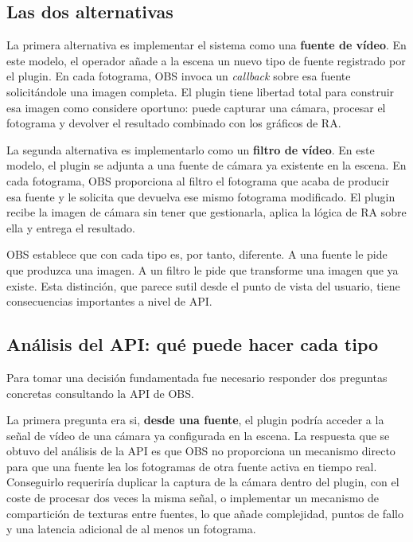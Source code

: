 \subsection{Las dos alternativas }
\label{subsec:alternativas_obs}

La primera alternativa es implementar el sistema como una \textbf{fuente de vídeo}. En este modelo, el operador añade a la escena un nuevo tipo de fuente registrado por el plugin. En cada fotograma, OBS invoca un \textit{callback} sobre esa fuente solicitándole una imagen completa. El plugin tiene libertad total para construir esa imagen como considere oportuno: puede capturar una cámara, procesar el fotograma y devolver el resultado combinado con los gráficos de RA.

La segunda alternativa es implementarlo como un \textbf{filtro de vídeo}. En este modelo, el plugin se adjunta a una fuente de cámara ya existente en la escena. En cada fotograma, OBS proporciona al filtro el fotograma que acaba de producir esa fuente y le solicita que devuelva ese mismo fotograma modificado. El plugin recibe la imagen de cámara sin tener que gestionarla, aplica la lógica de RA sobre ella y entrega el resultado.

 OBS establece que con cada tipo es, por tanto, diferente. A una fuente le pide que produzca una imagen. A un filtro le pide que transforme una imagen que ya existe. Esta distinción, que parece sutil desde el punto de vista del usuario, tiene consecuencias importantes a nivel de API.

\subsection{Análisis del API: qué puede hacer cada tipo}
\label{subsec:analisis_api}

Para tomar una decisión fundamentada fue necesario responder dos preguntas concretas consultando la API de OBS.

La primera pregunta era si, \textbf{desde una fuente}, el plugin podría acceder a la señal de vídeo de una cámara ya configurada en la escena. La respuesta que se obtuvo del análisis de la API es que OBS no proporciona un mecanismo directo para que una fuente lea los fotogramas de otra fuente activa en tiempo real. Conseguirlo requeriría duplicar la captura de la cámara dentro del plugin, con el coste de procesar dos veces la misma señal, o implementar un mecanismo de compartición de texturas entre fuentes, lo que añade complejidad, puntos de fallo y una latencia adicional de al menos un fotograma.

